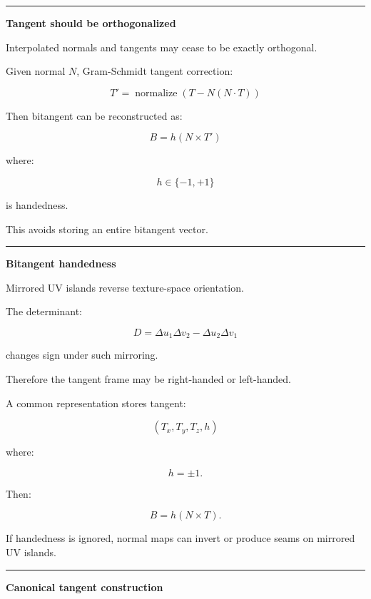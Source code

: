 \begin{center}\rule{0.5\linewidth}{0.5pt}\end{center}

\textbf{Tangent should be orthogonalized}

Interpolated normals and tangents may cease to be exactly orthogonal.

Given normal \(N\), Gram-Schmidt tangent correction:

\[
\boxed{
T'=
\operatorname{normalize}
(
T-N(N\cdot T)
)
}
\]

Then bitangent can be reconstructed as:

\[
B=
h(N\times T')
\]

where:

\[
h\in\{-1,+1\}
\]

is handedness.

This avoids storing an entire bitangent vector.

\begin{center}\rule{0.5\linewidth}{0.5pt}\end{center}

\textbf{Bitangent handedness}

Mirrored UV islands reverse texture-space orientation.

The determinant:

\[
D=
\Delta u_1\Delta v_2-
\Delta u_2\Delta v_1
\]

changes sign under such mirroring.

Therefore the tangent frame may be right-handed or left-handed.

A common representation stores tangent:

\[
(T_x,T_y,T_z,h)
\]

where:

\[
h=\pm1.
\]

Then:

\[
\boxed{
B=h(N\times T).
}
\]

If handedness is ignored, normal maps can invert or produce seams on mirrored UV islands.

\begin{center}\rule{0.5\linewidth}{0.5pt}\end{center}

\textbf{Canonical tangent construction}

